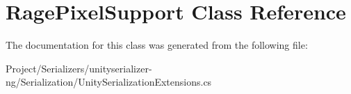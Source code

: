 \hypertarget{class_rage_pixel_support}{}\section{Rage\+Pixel\+Support Class Reference}
\label{class_rage_pixel_support}


The documentation for this class was generated from the following file\+:\begin{DoxyCompactItemize}
\item 
Project/\+Serializers/unityserializer-\/ng/\+Serialization/Unity\+Serialization\+Extensions.\+cs\end{DoxyCompactItemize}
